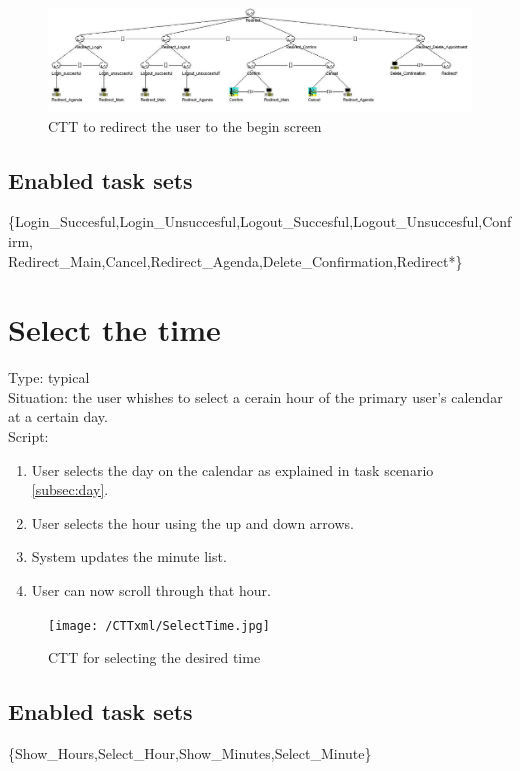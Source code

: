 \documentclass[11pt, a4paper,svglistings]{report}
\begin{document}
\begin{figure}[H]
\centering
    \includegraphics[width=1\textwidth]{Redirect.jpg}
  \caption[Redirect CTT]{\label{fig:CreateAppointment}CTT to redirect the user to the begin screen}
\end{figure}

\subsection{Enabled task sets}

\{Login\_Succesful,Login\_Unsuccesful,Logout\_Succesful,Logout\_Unsuccesful,Confirm, \\ Redirect\_Main,Cancel,Redirect\_Agenda,Delete\_Confirmation,Redirect*\}


\section{Select the time}

\label{subsec:hour}Type: typical \\
Situation: the user whishes to select a cerain hour  of the primary user's calendar at a certain day. \\
Script:
\begin{enumerate}
\item User selects the day on the calendar as explained in task scenario \ref{subsec:day}.
\item User selects the hour using the up and down arrows.
\item System updates the minute list.
\item User can now scroll through that hour.
\end{enumerate}

\begin{figure}[H]
\centering
    \texttt{[image: /CTTxml/SelectTime.jpg]}
  \caption[Select time CTT]{\label{fig:SelectTimeCTT}CTT for selecting the desired time}
\end{figure}

\subsection{Enabled task sets}

\{Show\_Hours,Select\_Hour,Show\_Minutes,Select\_Minute\}
\end{document}
